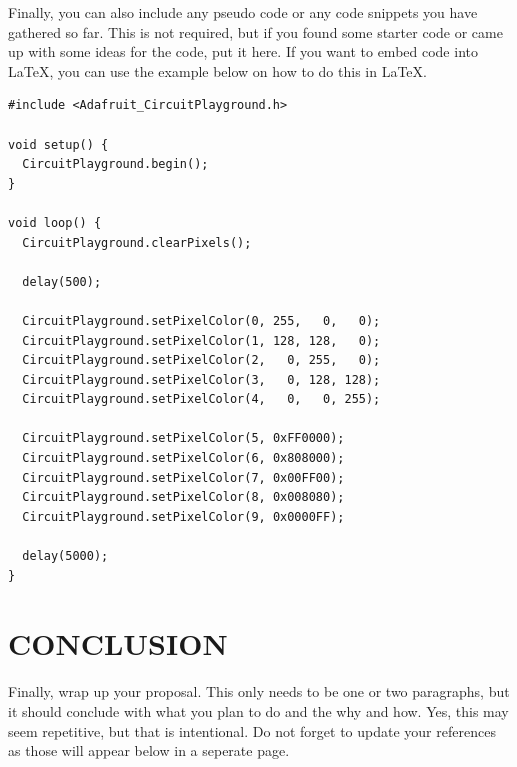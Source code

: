 \documentclass[12pt]{article}
\begin{document}
Finally, you can also include any pseudo code or any code snippets you have gathered so far.  This is not required, but if you found some starter code or came up with some ideas for the code, put it here. If you want to embed code into \LaTeX, you can use the example below on how to do this in \LaTeX.

\begin{lstlisting}[language=Arduino]
#include <Adafruit_CircuitPlayground.h>

void setup() {
  CircuitPlayground.begin();
}

void loop() {
  CircuitPlayground.clearPixels();

  delay(500);

  CircuitPlayground.setPixelColor(0, 255,   0,   0);
  CircuitPlayground.setPixelColor(1, 128, 128,   0);
  CircuitPlayground.setPixelColor(2,   0, 255,   0);
  CircuitPlayground.setPixelColor(3,   0, 128, 128);
  CircuitPlayground.setPixelColor(4,   0,   0, 255);
  
  CircuitPlayground.setPixelColor(5, 0xFF0000);
  CircuitPlayground.setPixelColor(6, 0x808000);
  CircuitPlayground.setPixelColor(7, 0x00FF00);
  CircuitPlayground.setPixelColor(8, 0x008080);
  CircuitPlayground.setPixelColor(9, 0x0000FF);
 
  delay(5000);
}
\end{lstlisting}

\section{CONCLUSION}
Finally, wrap up your proposal. This only needs to be one or two paragraphs, but it should conclude with what you plan to do and the why and how. Yes, this may seem repetitive, but that is intentional. Do not forget to update your references as those will appear below in a seperate page.

\newpage
\printbibliography[heading=subbibintoc]
%
%
\end{document}
